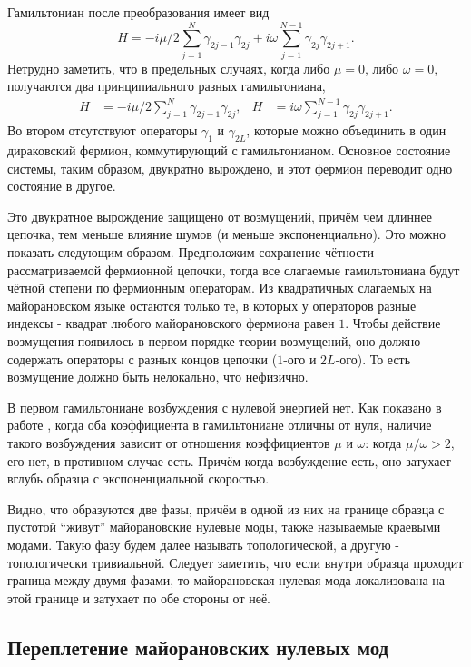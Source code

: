 \documentclass[a4paper,12pt]{article}
\theoremstyle{plain} %
\theoremstyle{definition} %
\theoremstyle{remark} %
\begin{document}
Гамильтониан после преобразования имеет вид
\begin{equation}
H = -i\mu/2 \sum\limits_{j=1}^N \gamma_{2j-1} \gamma_{2j} + i \omega \sum\limits_{j=1}^{N-1} \gamma_{2j} \gamma_{2j+1}.
\label{eq:main_hamiltonian}
\end{equation}
Нетрудно заметить, что в предельных случаях, когда либо $\mu = 0$, либо $\omega = 0$, получаются два принципиального разных гамильтониана,
\begin{align}
H &= -i\mu/2 \sum\limits_{j=1}^N \gamma_{2j-1} \gamma_{2j}, & H &= i \omega \sum\limits_{j=1}^{N-1} \gamma_{2j} \gamma_{2j+1}.
\end{align}
Во втором отсутствуют операторы $\gamma_1$ и $\gamma_{2L}$, которые можно объединить в один дираковский фермион, коммутирующий с гамильтонианом. Основное состояние системы, таким образом, двукратно вырождено, и этот фермион переводит одно состояние в другое.

Это двукратное вырождение защищено от возмущений, причём чем длиннее цепочка, тем меньше влияние шумов (и меньше экспоненциально). Это можно показать следующим образом. Предположим сохранение чётности рассматриваемой фермионной цепочки, тогда все слагаемые гамильтониана будут чётной степени по фермионным операторам. Из квадратичных слагаемых на майорановском языке остаются только те, в которых у операторов разные индексы - квадрат любого майорановского фермиона равен $1$. Чтобы действие возмущения появилось в первом порядке теории возмущений, оно должно содержать операторы с разных концов цепочки ($1$-ого и $2L$-ого). То есть возмущение должно быть нелокально, что нефизично. 

В первом гамильтониане возбуждения с нулевой энергией нет. Как показано в работе \cite{kitaev}, когда оба коэффициента в гамильтониане отличны от нуля, наличие такого возбуждения зависит от отношения коэффициентов $\mu$ и $\omega$: когда $\mu/\omega > 2$, его нет, в противном случае есть. Причём когда возбуждение есть, оно затухает вглубь образца с экспоненциальной скоростью.

Видно, что образуются две фазы, причём в одной из них на границе образца с пустотой ``живут'' майорановские нулевые моды, также называемые краевыми модами. Такую фазу будем далее называть топологической, а другую - топологически тривиальной. Следует заметить, что если внутри образца проходит граница между двумя фазами, то майорановская нулевая мода локализована на этой границе и затухает по обе стороны от неё.


\subsection{Переплетение майорановских нулевых мод} \label{subsec:braiding}
\end{document}
